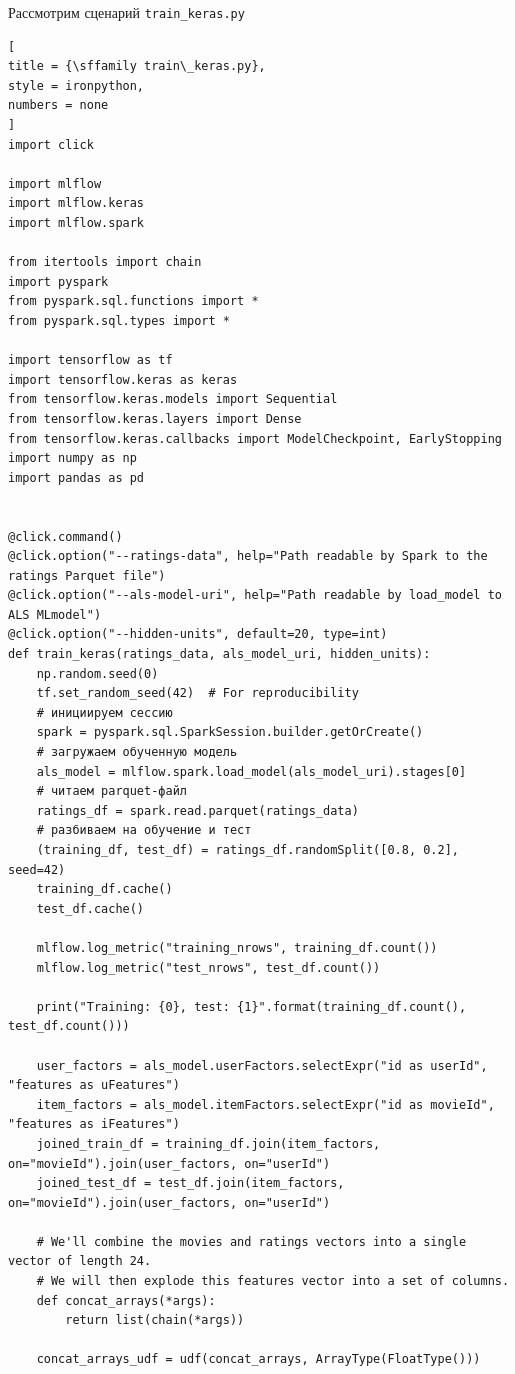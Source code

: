 \documentclass[%
	11pt,
	a4paper,
	utf8,
		]{article}
\begin{document}
Рассмотрим сценарий \texttt{train\_keras.py}
\begin{lstlisting}[
title = {\sffamily train\_keras.py},
style = ironpython,
numbers = none	
]
import click

import mlflow
import mlflow.keras
import mlflow.spark

from itertools import chain
import pyspark
from pyspark.sql.functions import *
from pyspark.sql.types import *

import tensorflow as tf
import tensorflow.keras as keras
from tensorflow.keras.models import Sequential
from tensorflow.keras.layers import Dense
from tensorflow.keras.callbacks import ModelCheckpoint, EarlyStopping
import numpy as np
import pandas as pd


@click.command()
@click.option("--ratings-data", help="Path readable by Spark to the ratings Parquet file")
@click.option("--als-model-uri", help="Path readable by load_model to ALS MLmodel")
@click.option("--hidden-units", default=20, type=int)
def train_keras(ratings_data, als_model_uri, hidden_units):
	np.random.seed(0)
	tf.set_random_seed(42)  # For reproducibility
	# инициируем сессию
	spark = pyspark.sql.SparkSession.builder.getOrCreate()
	# загружаем обученную модель
	als_model = mlflow.spark.load_model(als_model_uri).stages[0]
	# читаем parquet-файл
	ratings_df = spark.read.parquet(ratings_data)
	# разбиваем на обучение и тест
	(training_df, test_df) = ratings_df.randomSplit([0.8, 0.2], seed=42)
	training_df.cache()
	test_df.cache()

	mlflow.log_metric("training_nrows", training_df.count())
	mlflow.log_metric("test_nrows", test_df.count())

	print("Training: {0}, test: {1}".format(training_df.count(), test_df.count()))

	user_factors = als_model.userFactors.selectExpr("id as userId", "features as uFeatures")
	item_factors = als_model.itemFactors.selectExpr("id as movieId", "features as iFeatures")
	joined_train_df = training_df.join(item_factors, on="movieId").join(user_factors, on="userId")
	joined_test_df = test_df.join(item_factors, on="movieId").join(user_factors, on="userId")

	# We'll combine the movies and ratings vectors into a single vector of length 24.
	# We will then explode this features vector into a set of columns.
	def concat_arrays(*args):
		return list(chain(*args))

	concat_arrays_udf = udf(concat_arrays, ArrayType(FloatType()))


\end{lstlisting}
\end{document}
